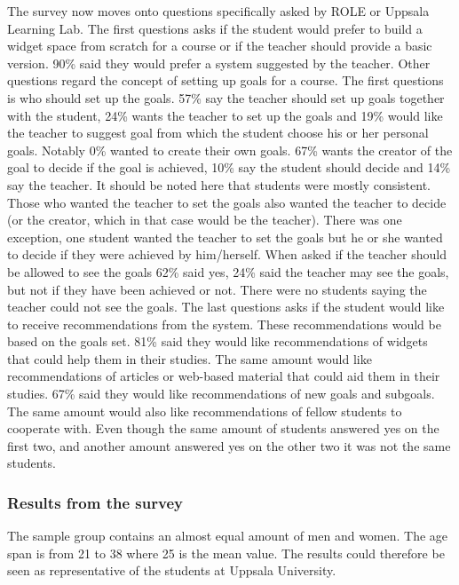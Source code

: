 The survey now moves onto questions specifically asked by ROLE or Uppsala Learning Lab. The first questions asks if the student would prefer to build a widget space from scratch for a course or if the teacher should provide a basic version. 90\% said they would prefer a system suggested by the teacher. Other questions regard the concept of setting up goals for a course. The first questions is who should set up the goals. 57\% say the teacher should set up goals together with the student, 24\% wants the teacher to set up the goals and 19\% would like the teacher to suggest goal from which the student choose his or her personal goals. Notably 0\% wanted to create their own goals.
67\% wants the creator of the goal to decide if the goal is achieved, 10\% say the student should decide and 14\% say the teacher. It should be noted here that students were mostly consistent. Those who wanted the teacher to set the goals also wanted the teacher to decide (or the creator, which in that case would be the teacher). There was one exception, one student wanted the teacher to set the goals but he or she wanted to decide if they were achieved by him/herself.
When asked if the teacher should be allowed to see the goals 62\% said yes, 24\% said the teacher may see the goals, but not if they have been achieved or not. There were no students saying the teacher could not see the goals.
The last questions asks if the student would like to receive recommendations from the system. These recommendations would be based on the goals set. 81\% said they would like recommendations of widgets that could help them in their studies. The same amount would like recommendations of articles or web-based material that could aid them in their studies. 67\% said they would like recommendations of new goals and subgoals. The same amount would also like recommendations of fellow students to cooperate with.
Even though the same amount of students answered yes on the first two, and another amount answered yes on the other two it was not the same students.

\subsubsection {Results from the survey}
The sample group contains an almost equal amount of men and women. The age span is from 21 to 38 where 25 is the mean value. The results could therefore be seen as representative of the students at Uppsala University.

